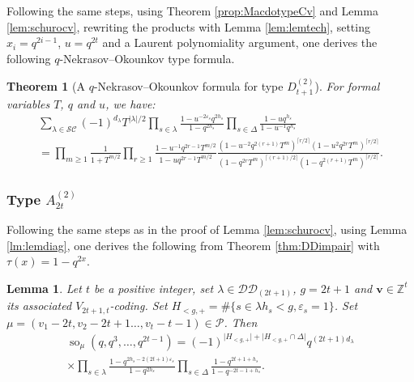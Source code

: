 \documentclass[11pt,letterpaper]{amsart}
\def\bbbz{\mathbb Z}
\def\ccsc{\mathcal {SC}}
\def\ccdd{\mathcal {DD}}
\def\ccp{\mathcal P}
\newtheorem{thm}[df]{Theorem}
\newtheorem{lm}[df]{Lemma}
\DeclareMathOperator{\oo}{so}
\numberwithin{equation}{section}
\numberwithin{df}{section}
\begin{document}
Following the same steps, using Theorem \ref{prop:MacdotypeCv} and Lemma \ref{lem:schurocv}, rewriting the products with Lemma \ref{lem:lemtech}, setting $x_i=q^{2i-1}$, $u=q^{2t}$ and a Laurent polynomiality argument, one derives the following $q$-Nekrasov--Okounkov type formula.
\begin{thm}[A $q$-Nekrasov--Okounkov formula for type $D^{(2)}_{t+1}$]\label{NOCV}
For formal variables $T$, $q$ and $u$, we have:
\begin{multline*}
\sum_{\lambda\in\ccsc} (-1)^{d_\lambda}T^{\lvert \lambda\rvert/2}\prod_{s\in\lambda}\frac{1-u^{-2\varepsilon_s}q^{2h_s}}{1-q^{2h_s}}\prod_{s\in\Delta}\frac{1-uq^{h_s}}{1-u^{-1}q^{h_s}}\\=
\prod_{m\geq 1}\frac{1}{1+T^{m/2}}\prod_{r\geq 1}\frac{1-u^{-1}q^{2r-1}T^{m/2}}{1-uq^{2r-1}T^{m/2}}\frac{\left(1-u^{-2}q^{2(r+1)}T^m\right)^{\lceil r/2 \rceil}\left(1-u^2q^{2r}T^m\right)^{\lceil r/2 \rceil}}{\left(1-q^{2r}T^m\right)^{\lceil (r+1)/2 \rceil}\left(1-q^{2(r+1)}T^m\right)^{\lceil r/2 \rceil}}.
\end{multline*}
\end{thm}



\subsubsection{Type $A^{(2)}_{2t}$}
Following the same steps as in the proof of Lemma \ref{lem:schurocv}, using Lemma \ref{lm:lemdiag}, one derives the following from Theorem \ref{thm:DDimpair} with $\tau(x)=1-q^{2x}$.
\begin{lm}\label{lem:schurobc}
Let $t$ be a positive integer, set $\lambda\in\ccdd_{(2t+1)}$, $g=2t+1$ and $\mathbf{v}\in\bbbz^t$ its associated $V_{2t+1,t}$-coding. Set $H_{<g,+}=\#\lbrace s\in\lambda h_s<g, \varepsilon_s=1\rbrace$. Set $\mu=(v_1-2t,v_2-2t+1\dots,v_t-t-1)\in\ccp$. Then
 \begin{multline*}\label{eq:schursobc}
\oo_{\mu}(q,q^3,\dots,q^{2t-1})=(-1)^{\lvert H_{<g,+}\rvert+\lvert H_{<g,+}\cap \Delta\rvert} q^{(2t+1) d_\lambda}\\
\times\prod_{s\in\lambda}\frac{1-q^{2h_s-2(2t+1)\varepsilon_s}}{1-q^{2h_s}}\prod_{s\in\Delta}\frac{1-q^{2t+1+h_s}}{1-q^{-2t-1+h_s}}.
 \end{multline*}
 \end{lm}
 
\end{document}
